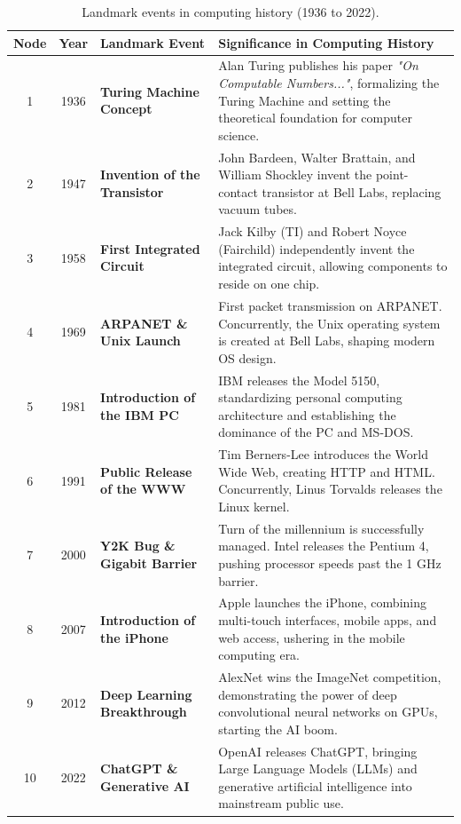 \documentclass[11pt,a4paper]{article}
\begin{document}
\begin{table}[h!]
\centering
\small
\renewcommand{\arraystretch}{1.4}
\begin{tabular}{c c p{1.6in} p{3.2in}}
\toprule
\color{darknavy}\textbf{Node} & \color{darknavy}\textbf{Year} & \color{darknavy}\textbf{Landmark Event} & \color{darknavy}\textbf{Significance in Computing History} \\
\midrule
1 & 1936 & \textbf{Turing Machine Concept} & Alan Turing publishes his paper \textit{"On Computable Numbers..."}, formalizing the Turing Machine and setting the theoretical foundation for computer science. \\
2 & 1947 & \textbf{Invention of the Transistor} & John Bardeen, Walter Brattain, and William Shockley invent the point-contact transistor at Bell Labs, replacing vacuum tubes. \\
3 & 1958 & \textbf{First Integrated Circuit} & Jack Kilby (TI) and Robert Noyce (Fairchild) independently invent the integrated circuit, allowing components to reside on one chip. \\
4 & 1969 & \textbf{ARPANET \& Unix Launch} & First packet transmission on ARPANET. Concurrently, the Unix operating system is created at Bell Labs, shaping modern OS design. \\
5 & 1981 & \textbf{Introduction of the IBM PC} & IBM releases the Model 5150, standardizing personal computing architecture and establishing the dominance of the PC and MS-DOS. \\
6 & 1991 & \textbf{Public Release of the WWW} & Tim Berners-Lee introduces the World Wide Web, creating HTTP and HTML. Concurrently, Linus Torvalds releases the Linux kernel. \\
7 & 2000 & \textbf{Y2K Bug \& Gigabit Barrier} & Turn of the millennium is successfully managed. Intel releases the Pentium 4, pushing processor speeds past the 1 GHz barrier. \\
8 & 2007 & \textbf{Introduction of the iPhone} & Apple launches the iPhone, combining multi-touch interfaces, mobile apps, and web access, ushering in the mobile computing era. \\
9 & 2012 & \textbf{Deep Learning Breakthrough} & AlexNet wins the ImageNet competition, demonstrating the power of deep convolutional neural networks on GPUs, starting the AI boom. \\
10 & 2022 & \textbf{ChatGPT \& Generative AI} & OpenAI releases ChatGPT, bringing Large Language Models (LLMs) and generative artificial intelligence into mainstream public use. \\
\bottomrule
\end{tabular}
\caption{Landmark events in computing history (1936 to 2022).}
\label{tab:timeline}
\end{table}
\end{document}
